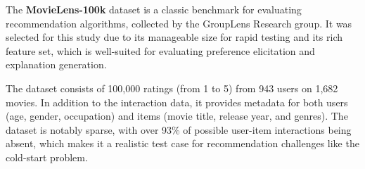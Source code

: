 The \textbf{MovieLens-100k} dataset is a classic benchmark for evaluating recommendation algorithms, collected by the GroupLens Research group. It was selected for this study due to its manageable size for rapid testing and its rich feature set, which is well-suited for evaluating preference elicitation and explanation generation.

The dataset consists of 100,000 ratings (from 1 to 5) from 943 users on 1,682 movies. In addition to the interaction data, it provides metadata for both users (age, gender, occupation) and items (movie title, release year, and genres). The dataset is notably sparse, with over 93\% of possible user-item interactions being absent, which makes it a realistic test case for recommendation challenges like the cold-start problem.